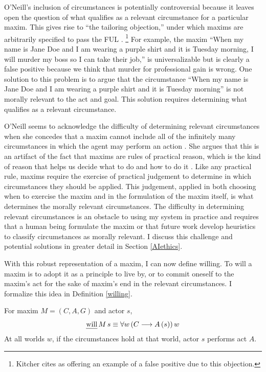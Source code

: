 \begin{isabellebody}
\begin{isamarkuptext}
O'Neill's inclusion of circumstances is potentially controversial because it leaves open the question of what qualifies as a 
relevant circumstance for a particular maxim. This gives rise to ``the tailoring objection,'' 
under which maxims are arbitrarily specified to pass the FUL  \citep[217]{whatisamaxim}. \footnote{Kitcher
cites \citet{kantsethicalthought} as offering an example of a false positive due to this objection.} For example, the maxim ``When my name is Jane Doe
and I am wearing a purple shirt and it is Tuesday morning, I will murder my boss so I can take their job,'' 
is universalizable but is clearly a false positive because we think that murder for professional gain is wrong. 
One solution to this problem is to argue that the circumstance ``When my name is Jane Doe and I am wearing a 
purple shirt and it is Tuesday morning'' is not morally relevant 
to the act and goal. This solution requires determining what qualifies as a relevant circumstance.

O'Neill seems to acknowledge the difficulty of determining relevant circumstances when she concedes that a maxim cannot include all 
of the infinitely many circumstances in which the agent may perform an action \citep[4:428]{actingonprinciple}. She argues that this is 
an artifact of the fact that maxims are rules of practical reason, which is the kind of reason that helps us decide what to do 
and how to do it \citep{bok}. Like any practical rule, 
maxims require the exercise of practical judgement to determine in which circumstances they should be applied. 
This judgement, applied in both choosing when to exercise the maxim and in the formulation of the maxim 
itself, is what determines the morally relevant circumstances.  
The difficulty in determining relevant circumstances is an obstacle to using my system in practice and requires that a 
human being formulate the maxim or that future work develop heuristics to classify circumstances as morally 
relevant. I discuss this challenge and potential solutions in greater detail in Section \ref{AIethics}.

With this robust representation of a maxim, I can now define willing. To will a maxim is to adopt it 
as a principle to live by, or to commit oneself to the maxim's act for the 
sake of maxim's end in the relevant circumstances. I formalize this idea in Definition \ref{willing}.

\begin{definition}[Willing]\label{willing}
For maxim $M = (C, A, G)$ and actor $s$,
$$\text{\emph{will}} \, M \, s \equiv \forall w \, (C \longrightarrow A \, (s)) \, w$$
\noindent At all worlds $w$, if the circumstances hold at that world, actor $s$ performs act $A$.
\end{definition}


\end{isamarkuptext}
\end{isabellebody}
